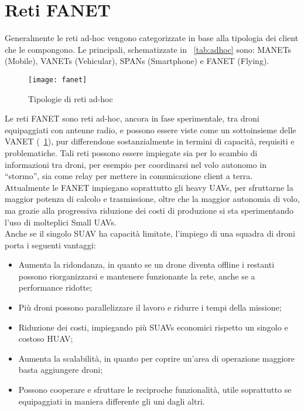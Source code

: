 \section[Reti FANET]{Reti FANET}
Generalmente le reti ad-hoc vengono categorizzate in base alla tipologia dei client che le compongono. Le principali, schematizzate in \tablename\ \ref{tab:adhoc}  sono: MANETs (Mobile), VANETs (Vehicular), SPANs (Smartphone) e FANET (Flying). \\

\begin{figure}
	\begin{center}
		\texttt{[image: fanet]}
	\end{center}
	\caption{Tipologie di reti ad-hoc} \label{fig:fanet}
\end{figure}


Le reti FANET sono reti ad-hoc, ancora in fase sperimentale, tra droni equipaggiati con antenne radio, e possono essere viste come un sottoinsieme delle VANET (\figurename\ \ref{fig:fanet}), pur differendone sostanzialmente in termini di capacità, requisiti e problematiche. 
Tali reti possono essere impiegate sia per lo scambio di informazioni tra droni, per esempio per coordinarsi nel volo autonomo in “stormo”, sia come relay per mettere in comunicazione client a terra. \\
Attualmente le FANET impiegano soprattutto gli heavy UAVs, per sfruttarne la maggior potenza di calcolo e trasmissione, oltre che la maggior autonomia di volo, ma grazie alla progressiva riduzione dei costi di produzione si sta sperimentando l'uso di molteplici Small UAVs. \\
Anche se il singolo SUAV ha capacità limitate, l'impiego di una squadra di droni  porta i seguenti vantaggi:
\begin{itemize}
	\item Aumenta la ridondanza, in quanto se un drone diventa offline i restanti possono riorganizzarsi e mantenere funzionante la rete, anche se a performance ridotte;
	\item Più droni possono parallelizzare il lavoro e ridurre i tempi della missione;
	\item Riduzione dei costi, impiegando più SUAVs economici rispetto un singolo e costoso HUAV;
	\item Aumenta la scalabilità, in quanto per coprire un'area di operazione maggiore basta aggiungere droni;
	\item Possono cooperare e sfruttare le reciproche funzionalità, utile soprattutto se equipaggiati in maniera differente gli uni dagli altri.
\end{itemize}

